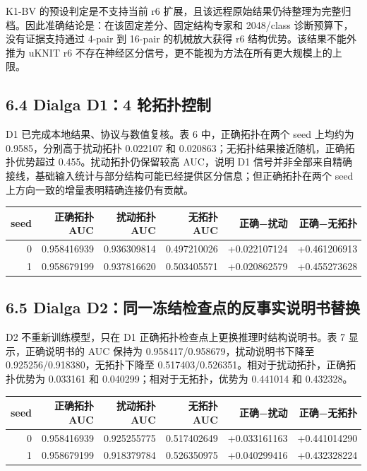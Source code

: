 \documentclass{templates/cjc-utf8}
\def\endhead{}
\newcommand{\papertabletitle}{}
\newcommand{\papertablecaption}[1]{\gdef\papertabletitle{#1}}
\begin{document}
K1-BV 的预设判定是不支持当前 r6 扩展，且该远程原始结果仍待整理为完整归档。因此准确结论是：在该固定差分、固定结构专家和
2048/class 诊断预算下，没有证据支持通过 4-pair 到 16-pair 的机械放大获得
r6 结构优势。该结果不能外推为 uKNIT r6
不存在神经区分信号，更不能视为方法在所有更大规模上的上限。

\hypertarget{dialga-d14-ux8f6eux62d3ux6251ux63a7ux5236}{%
\subsection{6.4 Dialga D1：4
轮拓扑控制}\label{dialga-d14-ux8f6eux62d3ux6251ux63a7ux5236}}

D1 已完成本地结果、协议与数值复核。表 6 中，正确拓扑在两个 seed
上均约为 0.9585，分别高于扰动拓扑 0.022107 和
0.020863；无拓扑结果接近随机，正确拓扑优势超过 0.455。扰动拓扑仍保留较高
AUC，说明 D1
信号并非全部来自精确接线，基础输入统计与部分结构可能已经提供区分信息；但正确拓扑在两个
seed 上方向一致的增量表明精确连接仍有贡献。

\papertablecaption{Dialga-128 prefix-r4 D1 本地复核结果}

\begin{longtable}[]{@{}rrrrrr@{}}
\toprule
seed & 正确拓扑 AUC & 扰动拓扑 AUC & 无拓扑 AUC & 正确−扰动 &
正确−无拓扑\tabularnewline
\midrule
\endhead
0 & 0.958416939 & 0.936309814 & 0.497210026 & +0.022107124 &
+0.461206913\tabularnewline
1 & 0.958679199 & 0.937816620 & 0.503405571 & +0.020862579 &
+0.455273628\tabularnewline
\bottomrule
\end{longtable}

\hypertarget{dialga-d2ux540cux4e00ux51bbux7ed3ux68c0ux67e5ux70b9ux7684ux53cdux4e8bux5b9eux8bf4ux660eux4e66ux66ffux6362}{%
\subsection{6.5 Dialga
D2：同一冻结检查点的反事实说明书替换}\label{dialga-d2ux540cux4e00ux51bbux7ed3ux68c0ux67e5ux70b9ux7684ux53cdux4e8bux5b9eux8bf4ux660eux4e66ux66ffux6362}}

D2 不重新训练模型，只在 D1 正确拓扑检查点上更换推理时结构说明书。表 7
显示，正确说明书的 AUC 保持为 0.958417/0.958679，扰动说明书下降至
0.925256/0.918380，无拓扑下降至
0.517403/0.526351。相对于扰动拓扑，正确拓扑优势为 0.033161 和
0.040299；相对于无拓扑，优势为 0.441014 和 0.432328。

\papertablecaption{Dialga D2 同检查点结构替换结果}

\begin{longtable}[]{@{}rrrrrr@{}}
\toprule
seed & 正确拓扑 AUC & 扰动拓扑 AUC & 无拓扑 AUC & 正确−扰动 &
正确−无拓扑\tabularnewline
\midrule
\endhead
0 & 0.958416939 & 0.925255775 & 0.517402649 & +0.033161163 &
+0.441014290\tabularnewline
1 & 0.958679199 & 0.918379784 & 0.526350975 & +0.040299416 &
+0.432328224\tabularnewline
\bottomrule
\end{longtable}
\end{document}
